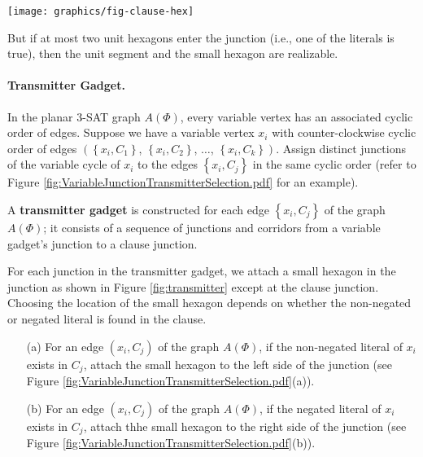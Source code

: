 \documentclass[10pt]{CSUNthesis}
\theoremstyle{plain}%
\theoremstyle{definition}
\theoremstyle{remark}
\begin{document}
\begin{minipage}{\linewidth}
\begin{center}
\texttt{[image: graphics/fig-clause-hex]}
\label{fig:clause}
\end{center}
\end{minipage}

But if at most two unit hexagons enter the junction (i.e., one of the literals is true), then the unit segment and the small hexagon are realizable.

\paragraph{Transmitter Gadget.}\label{transmitterGadget}

In the planar 3-SAT graph $A(\Phi)$, every variable vertex has an associated cyclic order of edges.
Suppose we have a variable vertex $x_i$ with counter-clockwise cyclic order of edges $\left(\left\lbrace x_i,C_1\right\rbrace\right.$, $\left\lbrace x_i,C_2\right\rbrace$, $\dots$, $\left.\left\lbrace x_i,C_k\right\rbrace\right) $.  
Assign distinct junctions of the variable cycle of $x_i$ to the edges $\left\lbrace x_i,C_j\right\rbrace$ in the same cyclic order (refer to Figure \ref{fig:VariableJunctionTransmitterSelection.pdf} for an example).

 A {\bf transmitter gadget} is constructed for each edge $\left\lbrace x_i,C_j\right\rbrace$ of the graph $A(\Phi)$; it consists of a sequence of junctions and corridors from a variable gadget's junction to a clause junction.

For each junction in the transmitter gadget, we attach a small hexagon in the junction as shown in Figure \ref{fig:transmitter} except at the clause junction.
Choosing the location of the small hexagon depends on whether the non-negated or negated literal is found in the clause.
\begin{itemize}
\item[(a)]  For an edge $(x_i,C_j)$ of the graph $A(\Phi)$, if the non-negated literal of $x_i$ exists in $C_j$, attach the small hexagon to the left side of the junction (see Figure \ref{fig:VariableJunctionTransmitterSelection.pdf}(a)).
\item[(b)]  For an edge $(x_i,C_j)$ of the graph $A(\Phi)$, if the negated literal of $x_i$ exists in $C_j$, attach thhe small hexagon to the right side of the junction (see Figure \ref{fig:VariableJunctionTransmitterSelection.pdf}(b)).
\end{itemize}
\end{document}
